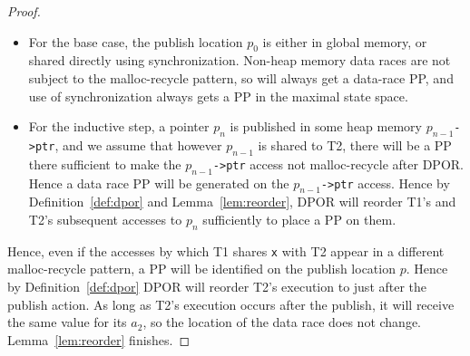 \begin{proof}
\newcommand\publish[1]{$p_{#1}$}
\begin{itemize}
	\item For the base case, the publish location \publish{0} is either in global memory, or shared directly using synchronization.
		Non-heap memory data races are not subject to the malloc-recycle pattern, so will always get a data-race PP,
		and use of synchronization always gets a PP in the maximal state space.
	\item For the inductive step, a pointer \publish{n} is published in some heap memory \publish{n-1}\texttt{->ptr},
		and we assume that however \publish{n-1} is shared to T2,
		there will be a PP there
		sufficient to make the \publish{n-1}\texttt{->ptr} access not malloc-recycle after DPOR.
		Hence a data race PP will be generated on the \publish{n-1}\texttt{->ptr} access.
		Hence by Definition~\ref{def:dpor} and Lemma~\ref{lem:reorder},
		DPOR will reorder T1's and T2's subsequent accesses to \publish{n} sufficiently to place a PP on them.
\end{itemize}

Hence, even if the accesses by which T1 shares {\tt x} with T2 appear in a different malloc-recycle pattern,
a PP will be identified on the publish location $p$.
Hence by Definition~\ref{def:dpor} DPOR will reorder T2's execution to just after the publish action.
As long as T2's execution occurs after the publish, it will receive the same value for its $a_2$, so the location of the data race does not change.
Lemma~\ref{lem:reorder} finishes.


\end{proof}



